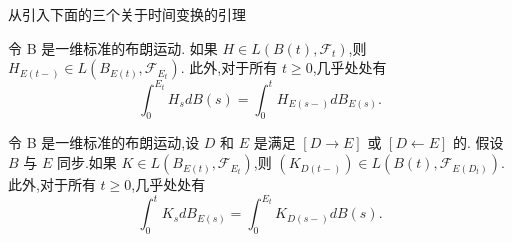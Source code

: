 
从\cite{umarov2018beyond}引入下面的三个关于时间变换的引理
\begin{lemma}[第一变量变换公式]\label{first}
	令 B 是一维标准的布朗运动.
	如果 $H \in L(B(t), \mathcal{F}_t)$,则 $H_{E(t-)} \in L(B_{E(t)}, \mathcal{F}_{E_t})$.
	此外,对于所有 $t \geqslant 0$,几乎处处有
	$$
	\int_0^{E_t} H_s dB(s) = \int_0^t H_{E(s-)} dB_{E(s)}.
	$$
\end{lemma}
\begin{lemma}[第二变量变换公式]\label{second}
	令 B 是一维标准的布朗运动,设 $D$ 和 $E$ 是满足 $[D \longrightarrow E]$ 或 $[D \longleftarrow E]$ 的.
	假设 $B$ 与 $E$ 同步.如果 $K \in L(B_{E(t)}, \mathcal{F}_{E_t})$,则 $(K_{D(t-)}) \in L(B(t), \mathcal{F}_{E(D_t)})$.
	此外,对于所有 $t \geqslant 0$,几乎处处有
	$$
	\int_0^t K_s dB_{E(s)} = \int_0^{E_t} K_{D(s-)} dB(s).
	$$
\end{lemma}

